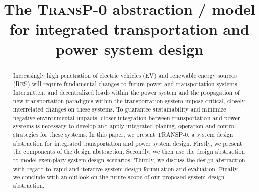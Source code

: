 \title{The \textsc{TransP-0} abstraction / model for integrated transportation and power system design}

\author{
	\and
}

\maketitle

\begin{abstract}
	Increasingly high penetration of electric vehicles (EV) and renewable energy sources (RES) will require fundamental changes to future power and transportation systems. Intermittent and decentralized loads within the power system and the propagation of new transportation paradigms within the transportation system impose critical, closely interrelated changes on these systems.
	To guarantee sustainability and minimize negative environmental impacts, closer integration between transportation and power systems is necessary to develop and apply integrated planing, operation and control strategies for these systems. In this paper, we present TRANSP-0, a system design abstraction for integrated transportation and power system design. Firstly, we present the components of the design abstraction. Secondly, we then use the design abstraction to model exemplary system design scenarios. Thirdly, we discuss the design abstraction with regard to rapid and iterative system design formulation and evaluation. Finally, we conclude with an outlook on the future scope of our proposed system design abstraction.
\end{abstract}
